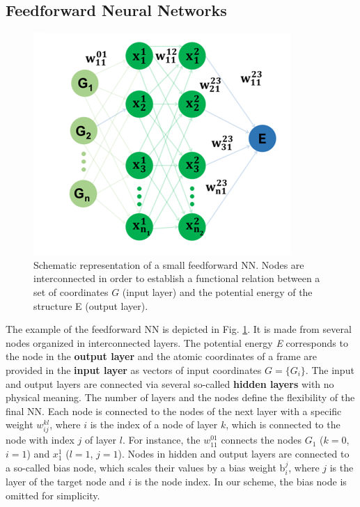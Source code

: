 \documentclass[12pt]{article}
\begin{document}
\subsection{Feedforward Neural Networks}
\begin{figure}[!h]
    \centering
    \includegraphics[scale=1.0]{latex_files/feed_forward_NN.png}
    \caption{Schematic representation of a small feedforward NN. Nodes are interconnected in order to establish a functional relation between a set of coordinates $G$ (input layer) and the potential energy of the structure E (output layer). }
    \label{NNP_scheme}
\end{figure}
The example of the feedforward NN is depicted in Fig. \ref{NNP_scheme}. It is made from several nodes organized in interconnected layers. The potential energy \textit{E} corresponds to the node in the \textbf{output layer} and the atomic coordinates of a frame are provided in the \textbf{input layer} as vectors of input coordinates $G=\{G_i\}$. The input and output layers are connected via several so-called \textbf{hidden layers} with no physical meaning. The number of layers and the nodes define the flexibility of the final NN. 
Each node is connected to the nodes of the next layer with a specific weight \textbf{$w_{ij}^{kl}$}, where $i$ is the index of a node of layer $k$, which is connected to the node with index $j$ of layer $l$. For instance, the $w_{11}^{01}$ connects the nodes $G_1$ ($k = 0$, $i=1$) and $x_1^1$ ($l=1$,  $j=1$). Nodes in hidden and output layers are connected to a so-called bias node, which scales their values by a bias weight b$_i^j$, where $j$ is the layer of the target node and $i$ is the node index. In our scheme, the bias node is omitted for simplicity.
\end{document}
